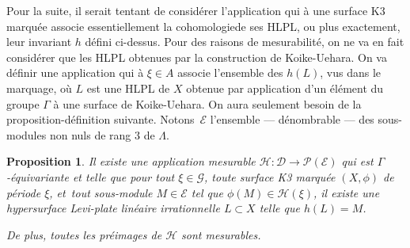 \documentclass[JEP,XML,SOM,Unicode,francais,published]{cedram}
\newtheorem{prop}[thm]{Proposition}
\theoremstyle{definition}
\begin{document}
Pour la suite, il serait tentant de considérer l'application qui à une surface K3 marquée associe essentiellement \og la cohomologie\fg de ses HLPL, ou plus exactement, leur invariant $h$ défini ci-dessus. Pour des raisons de mesurabilité, on ne va en fait considérer que les HLPL obtenues par la construction de Koike-Uehara. On va définir une application qui à $\xi \in A$ associe l'ensemble des $h(L)$, vus dans le marquage, où $L$ est une HLPL de $X$ obtenue par application d'un élément du groupe $\Gamma$ à une surface de Koike-Uehara. On aura seulement besoin de la proposition-définition suivante. Notons~$\mathscr{E}$ l'ensemble — dénombrable — des sous-modules non nuls de rang $3$ de $\Lambda$.

\begin{prop}
\label{prop:equiv-homologie}
Il existe une application mesurable $\mathscr{H} \colon \mathscr{D} \to \mathscr{P}(\mathscr{E})$ qui est $\Gamma$\nobreakdash-équi\-variante et telle que pour tout $\xi \in \mathscr{G}$, toute surface K3 marquée $(X, \phi)$ de période $\xi$, et~tout sous-module $M \in \mathscr{E}$ tel que $\phi(M) \in \mathscr{H}(\xi)$, il existe une hypersurface Levi-plate linéaire irrationnelle $L \subset X$ telle que $h(L) = M$.

De plus, toutes les préimages de $\mathscr{H}$ sont mesurables.
\end{prop}
\end{document}
